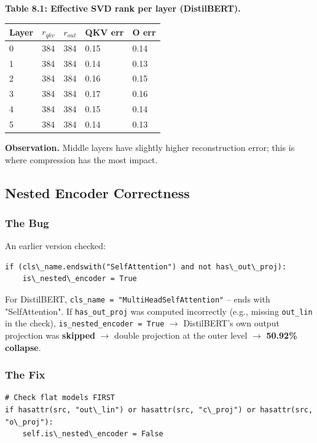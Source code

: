 \textbf{Table 8.1: Effective SVD rank per layer (DistilBERT).}

\begin{table}[H]
\centering
\small
\begin{tabular}{lllll}
\toprule
\textbf{Layer} & \textbf{$r_{qkv}$} & \textbf{$r_{out}$} & \textbf{QKV err} & \textbf{O err} \\
\midrule
0 & 384 & 384 & 0.15 & 0.14 \\
1 & 384 & 384 & 0.14 & 0.13 \\
2 & 384 & 384 & 0.16 & 0.15 \\
3 & 384 & 384 & 0.17 & 0.16 \\
4 & 384 & 384 & 0.15 & 0.14 \\
5 & 384 & 384 & 0.14 & 0.13 \\
\bottomrule
\end{tabular}
\end{table}

\textbf{Observation.} Middle layers have slightly higher reconstruction error; 
this is where compression has the most impact.

\subsection{Nested Encoder Correctness}

\subsubsection{The Bug}

An earlier version checked:
\begin{lstlisting}
if (cls\_name.endswith("SelfAttention") and not has\_out\_proj):
    is\_nested\_encoder = True
\end{lstlisting}

For DistilBERT, \texttt{cls\_name = "MultiHeadSelfAttention"} -- ends with 
"SelfAttention". If \texttt{has\_out\_proj} was computed incorrectly (e.g., missing 
\texttt{out\_lin} in the check), \texttt{is\_nested\_encoder = True} $\to$ DistilBERT's own output 
projection was \textbf{skipped} $\to$ double projection at the outer level $\to$ 
\textbf{50.92\% collapse}.

\subsubsection{The Fix}

\begin{lstlisting}
# Check flat models FIRST
if hasattr(src, "out\_lin") or hasattr(src, "c\_proj") or hasattr(src, "o\_proj"):
    self.is\_nested\_encoder = False
\end{lstlisting}

